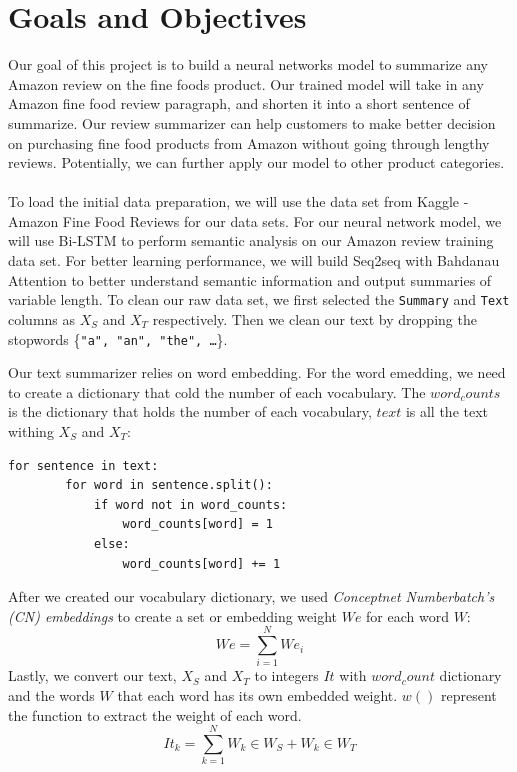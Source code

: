 \documentclass[conference]{IEEEtran}
\begin{document}
\section{Goals and Objectives}
Our goal of this project is to build a neural networks model to summarize any Amazon review on the fine foods product. Our trained model will take in any Amazon fine food review paragraph, and shorten it into a short sentence of summarize. Our review summarizer can help customers to make better decision on purchasing fine food products from Amazon without going through lengthy reviews. Potentially, we can further apply our model to other product categories.\\\\
\indent To load the initial data preparation, we will use the data set from Kaggle - Amazon Fine Food Reviews for our data sets. For our neural network model, we will use Bi-LSTM to perform semantic analysis on our Amazon review training data set. For better learning performance, we will build Seq2seq with Bahdanau Attention to better understand semantic information and output summaries of variable length.
\indent To clean our raw data set, we first selected the \texttt{Summary} and \texttt{Text} columns as $X_S$ and $X_T$ respectively. Then we clean our text by dropping the stopwords \{\texttt{"a", "an", "the", \ldots}\}.

\indent Our text summarizer relies on word embedding. For the word emedding, we need to create a dictionary that cold the number of each vocabulary. The $word_counts$ is the dictionary that holds the number of each vocabulary, $text$ is all the text withing $X_S$ and $X_T$:
\begin{lstlisting}
for sentence in text:
        for word in sentence.split():
            if word not in word_counts:
                word_counts[word] = 1
            else:
                word_counts[word] += 1
\end{lstlisting}

\indent After we created our vocabulary dictionary, we used \emph{Conceptnet Numberbatch's (CN) embeddings} to create a set or embedding weight $We$ for each word $W$:
\begin{equation}
    We = \sum_{i = 1}^{N} We_i
\end{equation}
\indent Lastly, we convert our text, $X_S$ and $X_T$ to integers $It$ with $word_count$ dictionary and the words $W$ that each word has its own embedded weight. $w()$ represent the function to extract the weight of each word.
\begin{equation}
    It_k = \sum_{k = 1}^{N}W_k \in W_S + W_k \in W_T
\end{equation}
\end{document}
